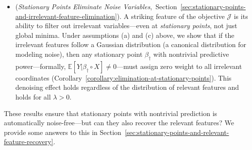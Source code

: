 \documentclass[sn-mathphys-num]{sn-jnl}%
\numberwithin{equation}{section}
\newcommand{\redblock}[1]{{\color{black}#1}}
\newcommand{\E}{\mathbb{E}}
\theoremstyle{thmstyleone}%
\theoremstyle{thmstyletwo}%
\theoremstyle{thmstylethree}%
\begin{document}
\redblock{
\vspace{.5em}
\begin{itemize}
\item (\emph{Stationary Points Eliminate Noise Variables},~Section~\ref{sec:stationary-points-and-irrelevant-feature-elimination}).
A striking feature of the objective $\mathcal{J}$ is its ability to filter out irrelevant variables---even at \emph{stationary points}, not just global minima. Under assumptions (a) and (c) above, we show that if the irrelevant features follow a Gaussian distribution (a canonical distribution for modeling noise), then any stationary point $\beta_\dagger$ with nontrivial predictive power---formally, $\E[Y|\beta_\dagger \circ X] \neq 0$---must assign zero weight to all irrelevant coordinates (Corollary~\ref{corollary:elimination-at-stationary-points}). This denoising effect holds regardless of the distribution of relevant features and holds for all $\lambda > 0$. %
\end{itemize}
}

\vspace{.3em}
These results ensure that stationary points with nontrivial prediction is automatically noise-free---but can they also recover the  relevant features? We provide some answers to this in Section~\ref{sec:stationary-points-and-relevant-feature-recovery}. 
\end{document}
